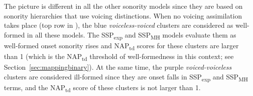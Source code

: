 The picture is different in all the other sonority models since they are based on sonority hierarchies that use voicing distinctions. When no voicing assimilation takes place (top row in ), the blue \emph{voiceless-voiced} clusters are considered as well-formed in all these models. The SSP\textsubscript{exp} and SSP\textsubscript{MH} models evaluate them as well-formed onset sonority rises and NAP\textsubscript{td} scores for these clusters are larger than 1 (which is the NAP\textsubscript{td} threshold of well-formedness in this context; see Section~\ref{sec:mappingbinary}). At the same time, the purple \emph{voiced-voiceless} clusters are considered ill-formed since they are onset falls in SSP\textsubscript{exp} and SSP\textsubscript{MH} terms, and the NAP\textsubscript{td} score of these clusters is not larger than 1.




